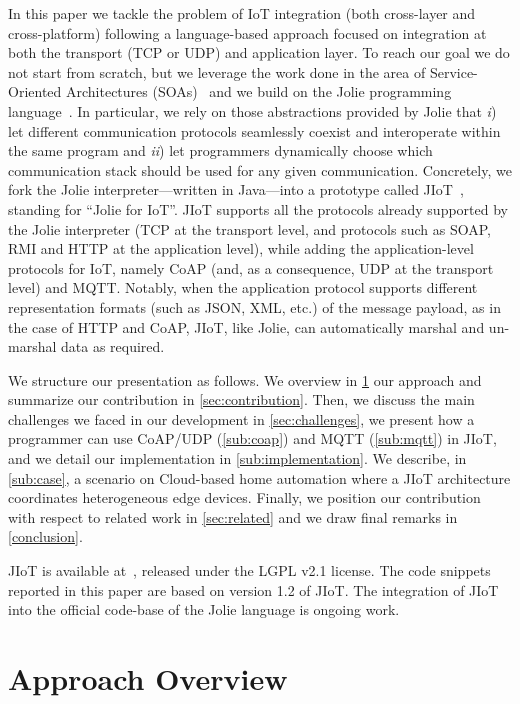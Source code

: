 In this paper we tackle the problem of IoT integration (both cross-layer and
cross-platform) following a language-based approach focused on integration at
both the transport (TCP or UDP) and application layer. To reach our goal we do
not start from scratch, but we leverage the work done in the area of
Service-Oriented Architectures (SOAs)~\cite{Erl07} and we build on the Jolie
programming language~\cite{MONTESI200719,MGZ07,MontesiGZ14,jolie-lang}. In
particular, we rely on those abstractions provided by Jolie that \emph{i}) let
different communication protocols seamlessly coexist and interoperate within
the same program and \emph{ii}) let programmers dynamically choose which
communication stack should be used for any given communication.
%
Concretely, we fork the Jolie interpreter---written in Java---into a prototype
called JIoT~\cite{jiot}, standing for ``Jolie for IoT''.
%
JIoT supports all the protocols already supported by the Jolie interpreter (TCP at the transport level, and protocols such as SOAP, RMI and HTTP at the application level), while adding the application-level protocols for IoT, namely CoAP (and, as a consequence, UDP at the transport level) and MQTT.
Notably, when the application protocol supports different
representation formats (such as JSON, XML, etc.) of the message payload, as in
the case of HTTP and CoAP, JIoT, like Jolie, can automatically marshal and un-marshal data
as required.

We structure our presentation as follows. We overview in \cref{sec:approach}
our approach and summarize our contribution in \cref{sec:contribution}. Then,
we discuss the main challenges we faced in our development in
\cref{sec:challenges}, we present how a programmer can use CoAP/UDP
(\cref{sub:coap}) and MQTT (\cref{sub:mqtt}) in JIoT, and we detail our
implementation in \cref{sub:implementation}. We describe, in \cref{sub:case},
a scenario on Cloud-based home automation where a JIoT architecture
coordinates heterogeneous edge devices. Finally, we position our contribution
with respect to related work in \cref{sec:related} and we draw final remarks
in \cref{conclusion}.

JIoT is available at~\cite{jiot}, released under the LGPL v2.1 license. The
code snippets reported in this paper are based on version 1.2 of JIoT. The
integration of JIoT into the official code-base of the Jolie language is
ongoing work.

\section{Approach Overview}
\label{sec:approach}

